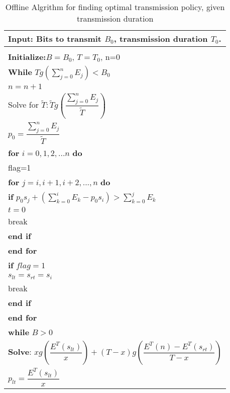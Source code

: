 \begin{table}
\begin{minipage}[b]{8cm}
\caption{Offline Algrithm for finding optimal transmission policy, given transmission duration}
\begin{tabular}{p{7cm}}
\hline \textbf{Input}: Bits to transmit $B_0$, transmission duration $T_0$.\\
\hline
\\
\textbf{Initialize:}$B = B_0$, $T = T_0$, n=0
\\
\textbf{While} $Tg(\sum_{j=0}^n E_j) < B_0$
\\
\hspace{4mm} $n = n+1$
\\
Solve for $\tilde{T}: \tilde{T}g(\dfrac{\sum_{j=0}^n E_j}{\tilde{T}})$
\\
$p_0=\dfrac{\sum_{j=0}^n E_j}{\tilde{T}}$
\\
\textbf{for} $i=0,1,2,...n$ \textbf{do}
\\
\hspace{4mm}flag=1
\\
\hspace{4mm}\textbf{for} $j=i,i+1,i+2,...,n$ \textbf{do}
\\
\hspace{7mm}\textbf{if} $p_0s_j + (\sum_{k=0}^i E_k - p_0s_i) > \sum_{k=0}^j E_k$
\\
\hspace{10mm}$t=0$
\\
\hspace{10mm}break
\\
\hspace{7mm}\textbf{end if}
\\
\hspace{4mm}\textbf{end for}
\\
\hspace{4mm}\textbf{if} $flag=1$
\\
\hspace{7mm}$s_{lt} = s_{rt} = s_i$
\\
\hspace{7mm}break
\\
\hspace{4mm}\textbf{end if}
\\
\textbf{end for}
\\
\textbf{while} $B>0$
\\
\hspace{4mm}\textbf{Solve}: $xg(\dfrac{E^T(s_{lt})}{x})+(T-x)g(\dfrac{E^T(n)-E^T(s_{rt})}{T-x})$
\\
\hspace{4mm}$p_{lt} = \dfrac{E^T(s_{lt})}{x}$

\end{tabular}
\end{minipage}
\end{table}
